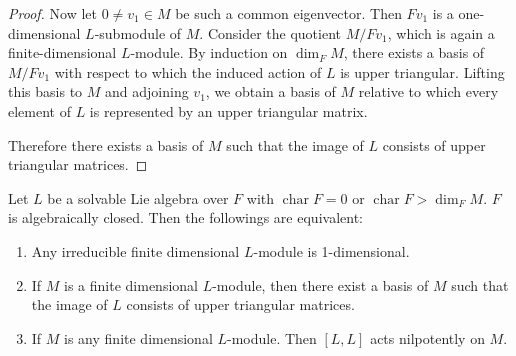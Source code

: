 \begin{proof}
    Now let $0\neq v_1\in M$ be such a common eigenvector. Then $Fv_1$ is a one-dimensional
    $L$-submodule of $M$. Consider the quotient $M/Fv_1$, which is again a finite-dimensional
    $L$-module. By induction on $\dim_F M$, there exists a basis of $M/Fv_1$ with respect to
    which the induced action of $L$ is upper triangular. Lifting this basis to $M$ and adjoining
    $v_1$, we obtain a basis of $M$ relative to which every element of $L$ is represented by an
    upper triangular matrix.

    Therefore there exists a basis of $M$ such that the image of $L$ consists of upper triangular
    matrices.
\end{proof}

\begin{proposition}
    Let $L$ be a solvable Lie algebra over $F$ with $\operatorname{char} F = 0$ or $\operatorname{char} F > \dim_F M$. $F$ is algebraically closed. Then the followings are equivalent:
    \begin{enumerate}
        \item Any irreducible finite dimensional $L$-module is 1-dimensional.
        \item If $M$ is a finite dimensional $L$-module, then there exist a basis of $M$ such that the image of $L$ consists of upper triangular matrices.
        \item If $M$ is any finite dimensional $L$-module. Then $[L,L]$ acts nilpotently on $M$.
    \end{enumerate}
\end{proposition}

